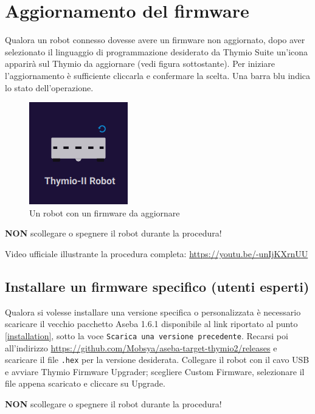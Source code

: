 \documentclass[12pt]{article}
\begin{document}
\section{Aggiornamento del firmware}

Qualora un robot connesso dovesse avere un firmware non aggiornato, dopo aver selezionato il linguaggio di programmazione desiderato da Thymio Suite un'icona apparirà sul Thymio da aggiornare (vedi figura sottostante). Per iniziare l'aggiornamento è sufficiente cliccarla e confermare la scelta. Una barra blu indica lo stato dell'operazione.

\begin{figure}[H]
	\centering
	\includegraphics{img/fwUpgrade.png}
	\caption{Un robot con un firmware da aggiornare}
	\label{fwUpgrade}
\end{figure}

\textbf{NON} scollegare o spegnere il robot durante la procedura!

Video ufficiale illustrante la procedura completa: \url{https://youtu.be/-unIjKXrnUU}\\


\subsection{Installare un firmware specifico (utenti esperti)}

Qualora si volesse installare una versione specifica o personalizzata è necessario scaricare il vecchio pacchetto Aseba 1.6.1 disponibile al link riportato al punto \ref{installation}, sotto la voce \texttt{Scarica una versione precedente}.
Recarsi poi all'indirizzo \url{https://github.com/Mobsya/aseba-target-thymio2/releases} e scaricare il file \texttt{.hex} per la versione desiderata. Collegare il robot con il cavo USB e avviare Thymio Firmware Upgrader; scegliere Custom Firmware, selezionare il file appena scaricato e cliccare su Upgrade.

\textbf{NON} scollegare o spegnere il robot durante la procedura!

\newpage
\end{document}
